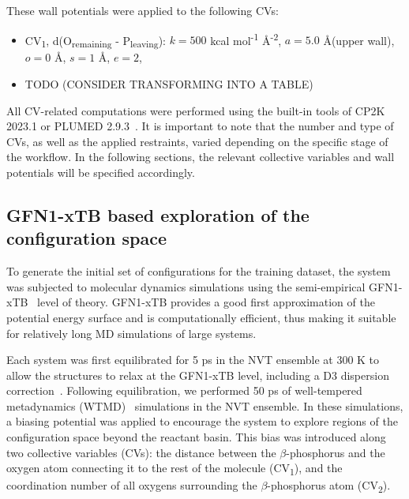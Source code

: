 These wall potentials were applied to the following CVs:
\begin{itemize}
    \item CV\textsubscript{1}, d(O\textsubscript{remaining} - P\textsubscript{leaving}): $k = 500$ kcal mol\textsuperscript{-1} \AA\textsuperscript{-2}, $a = 5.0$ \AA (upper wall), $o = 0$ \AA, $s = 1$ \AA, $e = 2$,
    \item TODO (CONSIDER TRANSFORMING INTO A TABLE)
\end{itemize}

All CV-related computations were performed using the built-in tools of CP2K 2023.1 \citep{kuhneCP2KElectronicStructure2020} or PLUMED 2.9.3~\citep{tribelloPLUMED2New2014}. It is important to note that the number and type of CVs, as well as the applied restraints, varied depending on the specific stage of the workflow. In the following sections, the relevant collective variables and wall potentials will be specified accordingly.



\subsection{GFN1-xTB based exploration of the configuration space}
\label{subsec:xtb-exploration-of-configuration-space}
To generate the initial set of configurations for the training dataset, the system was subjected to molecular dynamics simulations using the semi-empirical GFN1-xTB~\citep{grimmeRobustAccurateTightBinding2017} level of theory. GFN1-xTB provides a good first approximation of the potential energy surface and is computationally efficient, thus making it suitable for relatively long MD simulations of large systems. 

Each system was first equilibrated for 5 ps in the NVT ensemble at 300 K to allow the structures to relax at the GFN1-xTB level, including a D3 dispersion correction~\citep{grimmeConsistentAccurateInitio2010}. Following equilibration, we performed 50 ps of well-tempered metadynamics (WTMD)~\citep{barducciWellTemperedMetadynamicsSmoothly2008} simulations in the NVT ensemble. In these simulations, a biasing potential was applied to encourage the system to explore regions of the configuration space beyond the reactant basin. This bias was introduced along two collective variables (CVs): the distance between the $\beta$-phosphorus and the oxygen atom connecting it to the rest of the molecule (CV\textsubscript{1}), and the coordination number of all oxygens surrounding the $\beta$-phosphorus atom (CV\textsubscript{2}).

